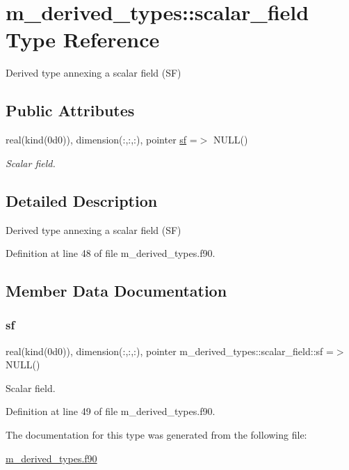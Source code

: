 \hypertarget{structm__derived__types_1_1scalar__field}{}\section{m\+\_\+derived\+\_\+types\+:\+:scalar\+\_\+field Type Reference}
\label{structm__derived__types_1_1scalar__field}


Derived type annexing a scalar field (SF)  


\subsection*{Public Attributes}
\begin{DoxyCompactItemize}
\item 
real(kind(0d0)), dimension(\+:,\+:,\+:), pointer \hyperlink{structm__derived__types_1_1scalar__field_a81eef148a1645bae2476fffacb82d735}{sf} =$>$ N\+U\+LL()
\begin{DoxyCompactList}\small\item\em Scalar field. \end{DoxyCompactList}\end{DoxyCompactItemize}


\subsection{Detailed Description}
Derived type annexing a scalar field (SF) 

Definition at line 48 of file m\+\_\+derived\+\_\+types.\+f90.



\subsection{Member Data Documentation}
\mbox{\label{structm__derived__types_1_1scalar__field_a81eef148a1645bae2476fffacb82d735}} 
\subsubsection{\texorpdfstring{sf}{sf}}
{\footnotesize\ttfamily real(kind(0d0)), dimension(\+:,\+:,\+:), pointer m\+\_\+derived\+\_\+types\+::scalar\+\_\+field\+::sf =$>$ N\+U\+LL()}



Scalar field. 



Definition at line 49 of file m\+\_\+derived\+\_\+types.\+f90.



The documentation for this type was generated from the following file\+:\begin{DoxyCompactItemize}
\item 
\hyperlink{m__derived__types_8f90}{m\+\_\+derived\+\_\+types.\+f90}\end{DoxyCompactItemize}
